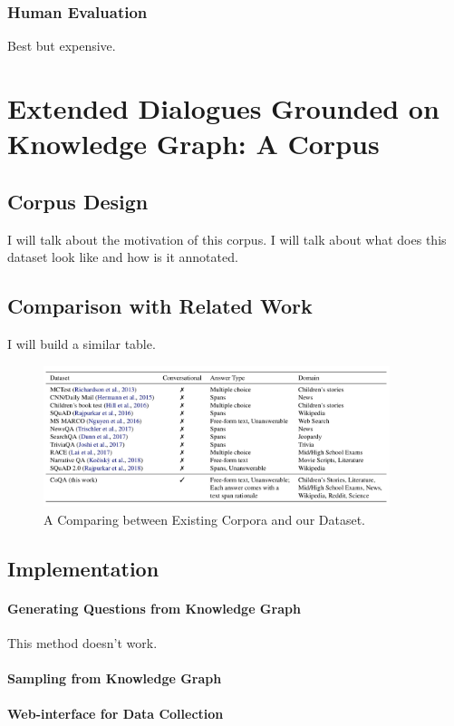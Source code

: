 \documentclass[bsc,frontabs,twoside,singlespacing,parskip,deptreport]{infthesis}     %
\begin{document}
\subsection{Human Evaluation}
Best but expensive.



\chapter{Extended Dialogues Grounded on Knowledge Graph: A Corpus}
\section{Corpus Design}
I will talk about the motivation of this corpus. I will talk about what does this dataset look like and how is it annotated.

\section{Comparison with Related Work}
I will build a similar table.
\begin{figure}[h]
    \centering
    \includegraphics[width=0.9\textwidth]{table.jpeg}
    \caption{A Comparing between Existing Corpora and our Dataset.}
    \label{fig:TABLE}
\end{figure}

\section{Implementation}
\subsubsection*{Generating Questions from Knowledge Graph}
This method doesn't work.
\subsubsection*{Sampling from Knowledge Graph}
\subsubsection*{Web-interface for Data Collection}
\end{document}
